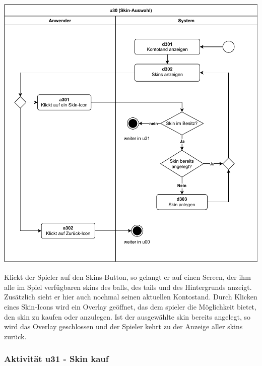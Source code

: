\includegraphics[width=\linewidth]{diagramme/pdf/UML-Activity-u30.pdf}
\label{fig:dia:skins}
\vspace*{0.5cm}

Klickt der Spieler auf den Skins-Button, so gelangt er auf einen Screen, der ihm alle im Spiel verfügbaren \gls{skin}s des \gls{ball}s, des \gls{tail}s und des Hintergrunds anzeigt. Zusätzlich sieht er hier auch nochmal seinen aktuellen Kontostand. Durch Klicken eines Skin-Icons wird ein Overlay geöffnet, das dem \gls{spieler} die Möglichkeit bietet, den \gls{skin} zu kaufen oder anzulegen. Ist der ausgewählte \gls{skin} bereits angelegt, so wird das Overlay geschlossen und der Spieler kehrt zu der Anzeige aller \gls{skin}s zurück.
\clearpage

\subsubsection{Aktivität u31 - Skin kauf}

\vspace*{1cm}

